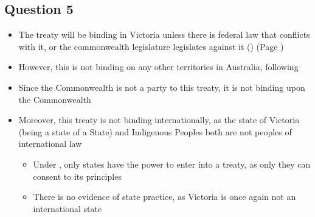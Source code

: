 \subsection*{Question 5}
\begin{itemize}
    \item The treaty will be binding in Victoria unless there is federal law that conflicts with it, or the commonwealth legislature legislates against it () (Page \pageref{case:Commonwealth v Tasmania})
    \item However, this is not binding on any other territories in Australia, following 
    \item Since the Commonwealth is not a party to this treaty, it is not binding upon the Commonwealth
    \item Moreover, this treaty is not binding internationally, as the state of Victoria (being a state of a State) and Indigenous Peoples both are not peoples of international law
    \begin{itemize}
        \item Under , only states have the power to enter into a treaty, as only they can consent to its principles
        \item There is no evidence of state practice, as Victoria is once again not an international state
    \end{itemize}
\end{itemize}

